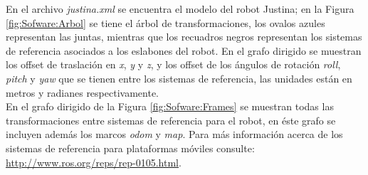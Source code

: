 \documentclass[user_manual.tex]{subfiles}
\begin{document}
En el archivo \textit{justina.xml} se encuentra el modelo del robot Justina; en la Figura  \ref{fig:Sofware:Arbol} se tiene el árbol de transformaciones, los ovalos azules representan las juntas, mientras que los recuadros negros representan los sistemas de referencia asociados a los eslabones del robot. En el grafo dirigido se muestran los offset de traslación en \textit{x}, \textit{y} y \textit{z}, y los offset de los ángulos de rotación \textit{roll}, \textit{pitch} y \textit{yaw} que se tienen entre los sistemas de referencia, las unidades están en metros y radianes respectivamente.\\

En el grafo dirigido de la Figura \ref{fig:Sofware:Frames} se muestran todas las transformaciones entre sistemas de referencia para el robot, en éste grafo se incluyen además los marcos \textit{odom} y \textit{map}. Para más información acerca de los sistemas de referencia para plataformas móviles consulte: \url{http://www.ros.org/reps/rep-0105.html}.
\end{document}
